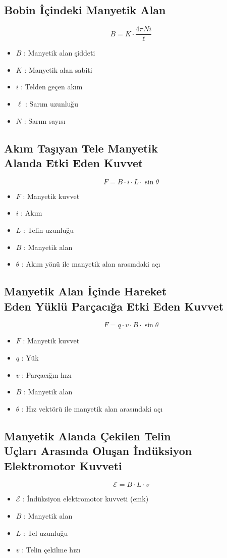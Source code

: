 \documentclass[a4paper, 11pt, titlepage]{article}
\begin{document}
\subsection{Bobin İçindeki Manyetik Alan}
\[
B = K \cdot \frac{4\pi Ni}{\ell}
\]
\begin{itemize}
  \item $B$ : Manyetik alan şiddeti
  \item $K$ : Manyetik alan sabiti
  \item $i$ : Telden geçen akım
  \item $\ell$ : Sarım uzunluğu
  \item $N$ : Sarım sayısı
\end{itemize}
\subsection[Tele Etki Eden Manyetik Kuvvet]{Akım Taşıyan Tele Manyetik \\Alanda Etki Eden Kuvvet}
\[
F = B \cdot i \cdot L \cdot \sin \theta
\]
\begin{itemize}
  \item $F$ : Manyetik kuvvet
  \item $i$ : Akım
  \item $L$ : Telin uzunluğu
  \item $B$ : Manyetik alan
  \item $\theta$ : Akım yönü ile manyetik alan arasındaki açı
\end{itemize}

\subsection[Hareket Eden Yüklü Parçacığa Etki Eden Manyetik Kuvvet]{Manyetik Alan İçinde Hareket \\Eden Yüklü Parçacığa Etki Eden Kuvvet}
\[
F = q \cdot v \cdot B \cdot \sin \theta
\]
\begin{itemize}
  \item $F$ : Manyetik kuvvet
  \item $q$ : Yük
  \item $v$ : Parçacığın hızı
  \item $B$ : Manyetik alan
  \item $\theta$ : Hız vektörü ile manyetik alan arasındaki açı
\end{itemize}

\subsection[Çekilen Telde İndüksiyon EMK]{Manyetik Alanda Çekilen Telin \\Uçları Arasında Oluşan İndüksiyon \\Elektromotor Kuvveti}
\[
\mathcal{E} = B \cdot L \cdot v
\]
\begin{itemize}
  \item $\mathcal{E}$ : İndüksiyon elektromotor kuvveti (emk)
  \item $B$ : Manyetik alan
  \item $L$ : Tel uzunluğu
  \item $v$ : Telin çekilme hızı
\end{itemize}
\end{document}
